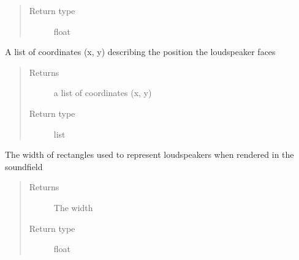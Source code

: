\documentclass[letterpaper,10pt,english]{sphinxmanual}
\begin{document}
\begin{fulllineitems}
\begin{fulllineitems}
\begin{quote}
\begin{description}
\item[{Return type}] \leavevmode
float

\end{description}\end{quote}

\end{fulllineitems}


\begin{fulllineitems}
\label{\detokenize{source/pyzones:pyzones.Loudspeaker.look_at}}
A list of coordinates (x, y) describing the position the loudspeaker faces
\begin{quote}\begin{description}
\item[{Returns}] \leavevmode
a list of coordinates (x, y)

\item[{Return type}] \leavevmode
list

\end{description}\end{quote}

\end{fulllineitems}


\begin{fulllineitems}
\label{\detokenize{source/pyzones:pyzones.Loudspeaker.width}}
The width of rectangles used to represent loudspeakers when rendered in the soundfield
\begin{quote}\begin{description}
\item[{Returns}] \leavevmode
The width

\item[{Return type}] \leavevmode
float

\end{description}\end{quote}

\end{fulllineitems}


\end{fulllineitems}

\end{document}
